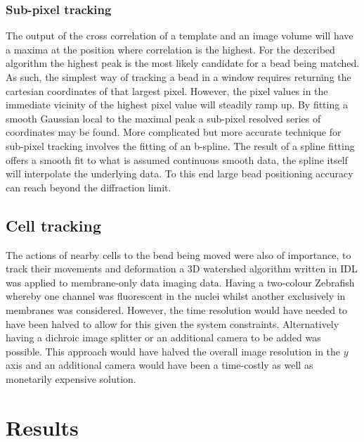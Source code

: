 \subsubsection{Sub-pixel tracking}

The output of the cross correlation of a template and an image volume will have a maxima at the position where correlation is the highest.
For the dexcribed algorithm the highest peak is the most likely candidate for a bead being matched.
As such, the simplest way of tracking a bead in a window requires returning the cartesian coordinates of that largest pixel.
However, the pixel values in the immediate vicinity of the highest pixel value will steadily ramp up.
By fitting a smooth Gaussian local to the maximal peak a sub-pixel resolved series of coordinates may be found.
More complicated but more accurate technique for sub-pixel tracking involves the fitting of an b-spline.
The result of a spline fitting offers a smooth fit to what is assumed continuous smooth data, the spline itself will interpolate the underlying data.
To this end large bead positioning accuracy can reach beyond the diffraction limit.

\subsection{Cell tracking}

The  actions of nearby cells to the bead being moved were also of importance, to track their movements and deformation a 3D watershed algorithm written in IDL was applied to membrane-only data imaging data.
Having a two-colour Zebrafish whereby one channel was fluorescent in the nuclei whilst another exclusively in membranes was considered.
However, the time resolution would have needed to have been halved to allow for this given the system constraints.
Alternatively having a dichroic image splitter or an additional camera to be added was possible.
This approach would have halved the overall image resolution in the $y$ axis and an additional camera would have been a time-costly as well as monetarily expensive solution.

\section{Results}

